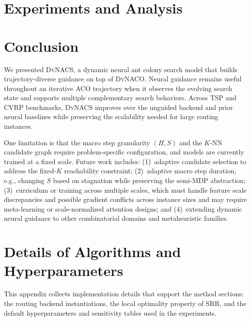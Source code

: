 \documentclass[journal]{IEEEtai}
\newcommand{\TSP}{\textsc{TSP}}
\newcommand{\CVRP}{\textsc{CVRP}}
\newcommand{\DyNACO}{\textsc{DyNACO}}
\newcommand{\DyNACS}{\textsc{DyNACS}}
\begin{document}
\section{Experiments and Analysis}
\label{sec:experiments}


\section{Conclusion}
\label{sec:conclusion}

We presented \DyNACS{}, a dynamic neural ant colony search model that builds trajectory-diverse guidance on top of \DyNACO{}. Neural guidance remains useful throughout an iterative ACO trajectory when it observes the evolving search state and supports multiple complementary search behaviors. Across \TSP{} and \CVRP{} benchmarks, \DyNACS{} improves over the unguided backend and prior neural baselines while preserving the scalability needed for large routing instances.

One limitation is that the macro step granularity $(H,S)$ and the $K$-NN candidate graph require problem-specific configuration, and models are currently trained at a fixed scale.
Future work includes: (1)~adaptive candidate selection to address the fixed-$K$ reachability constraint; (2)~adaptive macro step duration, e.g., changing $S$ based on stagnation while preserving the semi-MDP abstraction; (3)~curriculum or training across multiple scales, which must handle feature scale discrepancies and possible gradient conflicts across instance sizes and may require meta-learning or scale-normalized attention designs; and (4)~extending dynamic neural guidance to other combinatorial domains and metaheuristic families.

\appendix
\section{Details of Algorithms and Hyperparameters}
\label{app:setup}

This appendix collects implementation details that support the method sections: the routing backend instantiations, the local optimality property of SRR, and the default hyperparameters and sensitivity tables used in the experiments.
\end{document}
